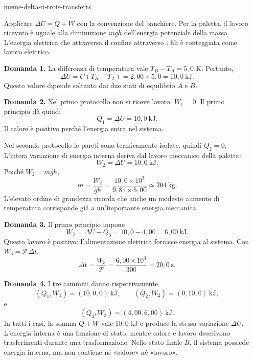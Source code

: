 \begin{exo}{meme-delta-u-trois-transferts}
\begin{indication}
Applicare $\Delta U=Q+W$ con la convenzione del banchiere. Per la paletta, il
lavoro ricevuto è uguale alla diminuzione $mgh$ dell'energia potenziale della
massa. L'energia elettrica che attraversa il confine attraverso i fili è
conteggiata come lavoro elettrico.
\end{indication}

\begin{solution}
\textbf{Domanda 1.} La differenza di temperatura vale $T_B-T_A=5{,}0$ K. Pertanto,
\[\Delta U=C(T_B-T_A)=2{,}00\times5{,}0=10{,}0\ \mathrm{kJ}.\]
Questo valore dipende soltanto dai due stati di equilibrio $A$ e $B$.

\textbf{Domanda 2.} Nel primo protocollo non si riceve lavoro: $W_1=0$.
Il primo principio dà quindi
\[Q_1=\Delta U=10{,}0\ \mathrm{kJ}.\]
Il calore è positivo perché l'energia entra nel sistema.

Nel secondo protocollo le pareti sono termicamente isolate, quindi $Q_2=0$.
L'intera variazione di energia interna deriva dal lavoro meccanico della paletta:
\[W_2=\Delta U=10{,}0\ \mathrm{kJ}.\]
Poiché $W_2=mgh$,
\[m=\frac{W_2}{gh}=\frac{10{,}0\times10^3}{9{,}81\times5{,}00}\simeq204\ \mathrm{kg}.\]
L'elevato ordine di grandezza ricorda che anche un modesto aumento di
temperatura corrisponde già a un'importante energia meccanica.

\textbf{Domanda 3.} Il primo principio impone
\[W_3=\Delta U-Q_3=10{,}0-4{,}00=6{,}00\ \mathrm{kJ}.\]
Questo lavoro è positivo: l'alimentazione elettrica fornisce energia al sistema.
Con $W_3=\mathcal P\,\Delta t$,
\[\Delta t=\frac{W_3}{\mathcal P}=\frac{6{,}00\times10^3}{300}=20{,}0\ \mathrm{s}.\]

\textbf{Domanda 4.} I tre cammini danno rispettivamente
\[(Q_1,W_1)=(10{,}0,0)\ \mathrm{kJ},\qquad(Q_2,W_2)=(0,10{,}0)\ \mathrm{kJ},\]
e
\[(Q_3,W_3)=(4{,}00,6{,}00)\ \mathrm{kJ}.\]
In tutti i casi, la somma $Q+W$ vale $10{,}0$ kJ e produce la stessa variazione
$\Delta U$. L'energia interna è una funzione di stato, mentre calore e lavoro
descrivono trasferimenti durante una trasformazione. Nello stato finale $B$,
il sistema possiede energia interna, ma non contiene né «calore» né «lavoro».
\end{solution}
\end{exo}

